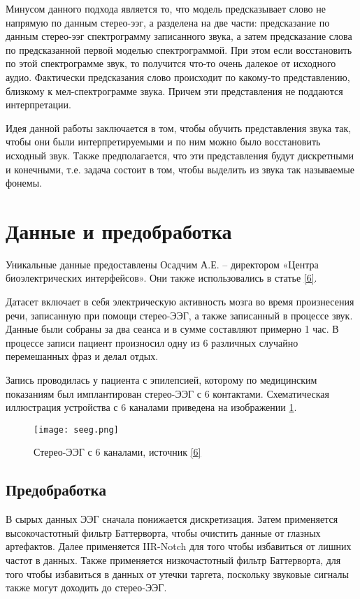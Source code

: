 \documentclass[a4paper,14pt]{extarticle}
\begin{document}
Минусом данного подхода является то, что модель предсказывает слово не напрямую по данным стерео-ээг, а разделена на две части: предсказание по данным стерео-ээг спектрограмму записанного звука, а затем предсказание слова по предсказанной первой моделью спектрограммой. При этом если восстановить по этой спектрограмме звук, то получится что-то очень далекое от исходного аудио. Фактически предсказания слово происходит по какому-то представлению, близкому к мел-спектрограмме звука. Причем эти представления не поддаются интерпретации.

Идея данной работы заключается в том, чтобы обучить представления звука так, чтобы они были интерпретируемыми и по ним можно было восстановить исходный звук. Также предполагается, что эти представления будут дискретными и конечными, т.е. задача состоит в том, чтобы выделить из звука так называемые фонемы.

\section{Данные и предобработка}
Уникальные данные предоставлены Осадчим А.Е. – директором «Центра биоэлектрических интерфейсов». Они также использовались в статье \hyperlink{b_6}{[6]}.

Датасет включает в себя электрическую активность мозга во время произнесения речи, записанную при помощи стерео-ЭЭГ, а также записанный в процессе звук. Данные были собраны за два сеанса и в сумме составляют примерно 1 час. В процессе записи пациент произносил одну из 6 различных случайно перемешанных фраз и делал отдых.

Запись проводилась у пациента с эпилепсией, которому по медицинским показаниям был имплантирован стерео-ЭЭГ с 6 контактами. Схематическая иллюстрация устройства с 6 каналами приведена на изображении \ref{fig:seeg}.

\begin{figure}[H]
	\centering
	\texttt{[image: seeg.png]}
	\caption{Стерео-ЭЭГ с 6 каналами, источник \protect\hyperlink{b_6}{[6]} }
	\label{fig:seeg}
\end{figure}

\subsection{Предобработка}
В сырых данных ЭЭГ сначала понижается дискретизация. Затем применяется высокочастотный фильтр Баттерворта, чтобы очистить данные от глазных артефактов. Далее применяется IIR-Notch для того чтобы избавиться от лишних частот в данных. Также применяется низкочастотный фильтр Баттерворта, для того чтобы избавиться в данных от утечки таргета, поскольку звуковые сигналы также могут доходить до стерео-ЭЭГ.
\end{document}
